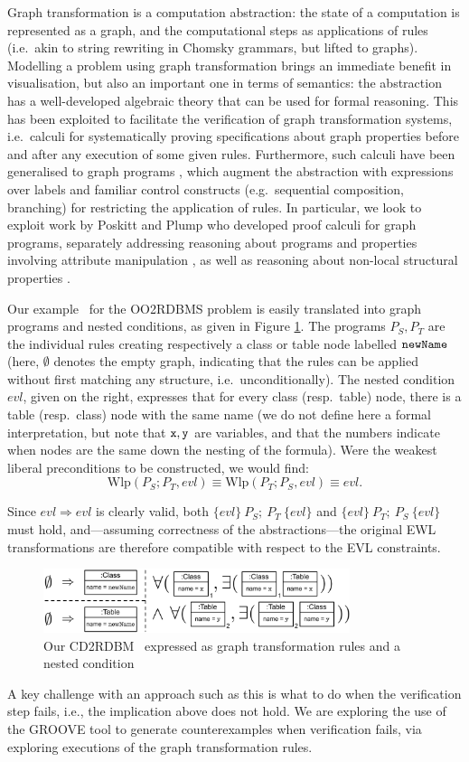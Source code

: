 	Graph transformation is a computation abstraction: the state of a computation is represented as a graph, and the computational steps as applications of rules (i.e.\ akin to string rewriting in Chomsky grammars, but lifted to graphs). Modelling a problem using graph transformation brings an immediate benefit in visualisation, but also an important one in terms of semantics: the abstraction has a well-developed algebraic theory that can be used for formal reasoning. This has been exploited to facilitate the verification of graph transformation systems, i.e.\ calculi for systematically proving specifications about graph properties before and after any execution of some given rules. Furthermore, such calculi have been generalised to graph programs \cite{Plump12a}, which augment the abstraction with expressions over labels and familiar control constructs (e.g.\ sequential composition, branching) for restricting the application of rules. In particular, we look to exploit work by Poskitt and Plump who developed proof calculi for graph programs, separately addressing reasoning about programs and properties involving attribute manipulation \cite{Poskitt13a,Poskitt-Plump12a}, as well as reasoning about non-local structural properties \cite{Poskitt-Plump14a}.

Our example \BX\ for the OO2RDBMS problem is easily translated into graph programs and nested conditions, as given in Figure \ref{fig:ex-program-constraints}. The programs $P_S,P_T$ are the individual rules creating respectively a class or table node labelled $\tt newName$ (here, $\emptyset$ denotes the empty graph, indicating that the rules can be applied without first matching any structure, i.e.\ unconditionally). The nested condition $evl$, given on the right, expresses that for every class (resp.\ table) node, there is a table (resp.\ class) node with the same name (we do not define here a formal interpretation, but note that $\tt x,y$ are variables, and that the numbers indicate when nodes are the same down the nesting of the formula). Were the weakest liberal preconditions to be constructed, we would find:
	\[ \text{Wlp}(P_S;P_T,evl) \equiv \text{Wlp}(P_T;P_S,evl) \equiv evl. \]
	
	\noindent Since $evl \Rightarrow evl$ is clearly valid, both $\{evl\}\ P_S;\ P_T\ \{evl\}$ and $\{evl\}\ P_T;\ P_S\ \{evl\}$ must hold, and---assuming correctness of the abstractions---the original EWL transformations are therefore compatible with respect to the EVL constraints.
	
	\begin{figure}[htb]
\vspace*{-10pt}
		\centering
		\includegraphics[width=0.8\textwidth]{ex-program-constraints.pdf}
		\caption{Our CD2RDBM \BX\ expressed as graph transformation rules and a nested condition}
\vspace*{-20pt}
		\label{fig:ex-program-constraints}
	\end{figure}

A key challenge with an approach such as this is what to do when the verification step fails, i.e., the implication above does not hold. We are exploring the use of the GROOVE tool to generate counterexamples when verification fails, via exploring executions of the graph transformation rules.
